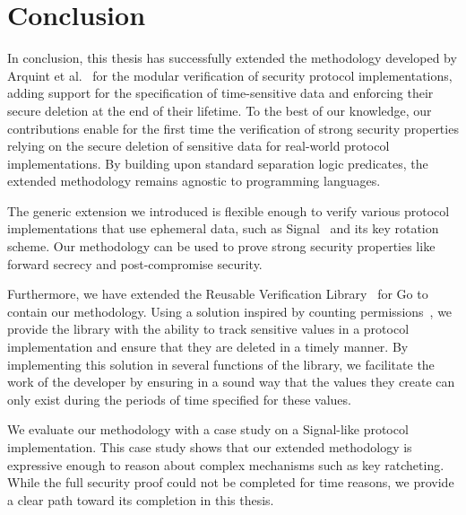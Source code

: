 \chapter{Conclusion}
\label{chap:conclusion}

In conclusion, this thesis has successfully extended the methodology developed by Arquint et al.~\cite{ArquintSchwerhoffMehtaMueller23} for the modular verification of security protocol implementations, adding support for the specification of time-sensitive data and enforcing their secure deletion at the end of their lifetime.
To the best of our knowledge, our contributions enable for the first time the verification of strong security properties relying on the secure deletion of sensitive data for real-world protocol implementations.
By building upon standard separation logic predicates, the extended methodology remains agnostic to programming languages.

The generic extension we introduced is flexible enough to verify various protocol implementations that use ephemeral data, such as Signal~\cite{marlinspike2016x3dh} and its key rotation scheme. Our methodology can be used to prove strong security properties like forward secrecy and post-compromise security.

Furthermore, we have extended the Reusable Verification Library~\cite{ArquintSchwerhoffMehtaMueller23} for Go to contain our methodology.
Using a solution inspired by counting permissions~\cite{roshardt2021extending}, we provide the library with the ability to track sensitive values in a protocol implementation and ensure that they are deleted in a timely manner.
By implementing this solution in several functions of the library, we facilitate the work of the developer by ensuring in a sound way that the values they create can only exist during the periods of time specified for these values.

We evaluate our methodology with a case study on a Signal-like protocol implementation.
This case study shows that our extended methodology is expressive enough to reason about complex mechanisms such as key ratcheting.
While the full security proof could not be completed for time reasons, we provide a clear path toward its completion in this thesis.

